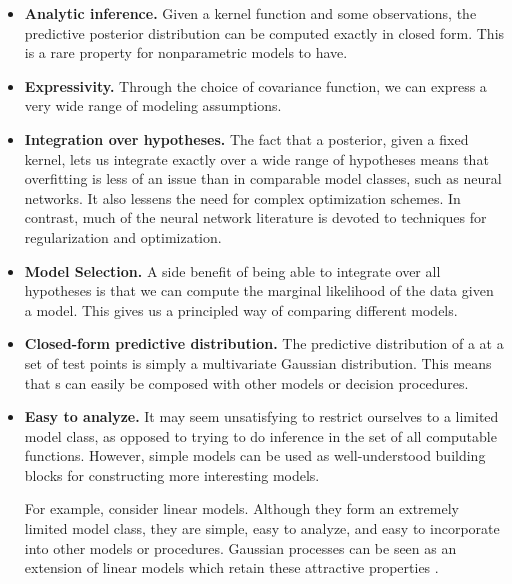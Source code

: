\begin{itemize}

\item {\bf Analytic inference.}
Given a kernel function and some observations, the predictive posterior distribution can be computed exactly in closed form.
This is a rare property for nonparametric models to have.

\item {\bf Expressivity.}
Through the choice of covariance function, we can express a very wide range of modeling assumptions.

\item {\bf Integration over hypotheses.}
The fact that a \gp{} posterior, given a fixed kernel, lets us integrate exactly over a wide range of hypotheses means that overfitting is less of an issue than in comparable model classes, such as neural networks.
It also lessens the need for complex optimization schemes.
%
In contrast, much of the neural network literature is devoted to techniques for regularization and optimization.

\item {\bf Model Selection.}
A side benefit of being able to integrate over all hypotheses is that we can compute the marginal likelihood of the data given a model.
This gives us a principled way of comparing different models.

\item {\bf Closed-form predictive distribution.}
The predictive distribution of a \gp{} at a set of test points is simply a multivariate Gaussian distribution.
This means that \gp{}s can easily be composed with other models or decision procedures.

\item {\bf Easy to analyze.}
It may seem unsatisfying to restrict ourselves to a limited model class, as opposed to trying to do inference in the set of all computable functions.
However, simple models can be used as well-understood building blocks for constructing more interesting models. %

For example, consider linear models.
Although they form an extremely limited model class, they are simple, easy to analyze, and easy to incorporate into other models or procedures.
Gaussian processes can be seen as an extension of linear models which retain these attractive properties \citep{rasmussen38gaussian}.


\end{itemize}




